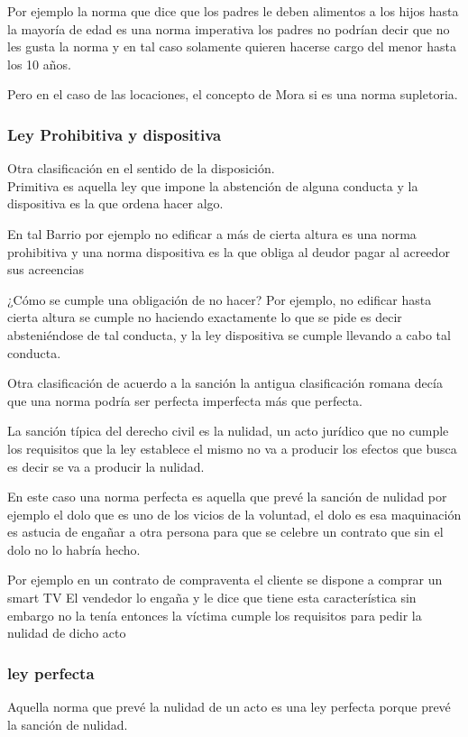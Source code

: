 \documentclass[12pt]{book}
\begin{document}
Por ejemplo la norma que dice que los padres le deben alimentos a los hijos hasta la mayoría de edad es una norma imperativa los padres no podrían decir que no les gusta la norma y en tal caso solamente quieren hacerse cargo del menor hasta los 10 años.

Pero en el caso de las locaciones, el concepto de Mora si es una norma supletoria.


\subsubsection{Ley Prohibitiva y dispositiva} Otra clasificación en el sentido de la disposición. \\

Primitiva es aquella ley que impone la abstención de alguna conducta y la dispositiva es la que ordena hacer algo.

En tal Barrio por ejemplo no edificar a más de cierta altura es una norma prohibitiva y una norma dispositiva es la que obliga al deudor pagar al acreedor sus acreencias

¿Cómo se cumple una obligación de no hacer?
Por ejemplo, no edificar hasta cierta altura se cumple no haciendo exactamente lo que se pide es decir absteniéndose de tal conducta, y la ley dispositiva se cumple llevando a cabo tal conducta.

Otra clasificación de acuerdo a la sanción
la antigua clasificación romana decía que una norma podría ser perfecta imperfecta más que perfecta.

La sanción típica del derecho civil es la nulidad, un acto jurídico que no cumple los requisitos que la ley establece el mismo no va a producir los efectos que busca es decir se va a producir la nulidad.

En este caso una norma perfecta es aquella que prevé la sanción de nulidad por ejemplo el dolo que es uno de los vicios de la voluntad, el dolo es esa maquinación es astucia de engañar a otra persona para que se celebre un contrato que sin el dolo no lo habría hecho.

Por ejemplo en un contrato de compraventa el cliente se dispone a comprar un smart TV El vendedor lo engaña y le dice que tiene esta característica sin embargo no la tenía entonces la víctima cumple los requisitos para pedir la nulidad de dicho acto
\subsubsection{ley perfecta}
Aquella norma que prevé la nulidad de un acto es una ley perfecta porque prevé la sanción de nulidad.
\end{document}
